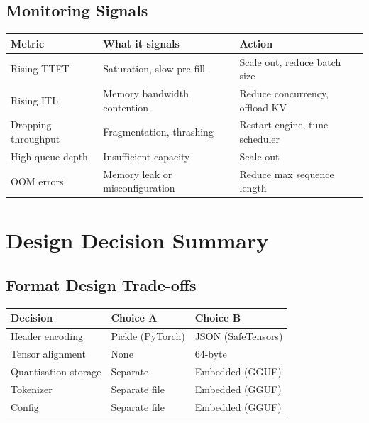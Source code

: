 \documentclass[11pt,a4paper]{article}
\theoremstyle{definition}
\begin{document}
\subsection{Monitoring Signals}

\begin{longtable}{p{3.5cm}p{4cm}p{4cm}}
	\toprule
	\textbf{Metric}     & \textbf{What it signals}        & \textbf{Action}                \\
	\midrule
	Rising TTFT         & Saturation, slow pre-fill       & Scale out, reduce batch size   \\
	Rising ITL          & Memory bandwidth contention     & Reduce concurrency, offload KV \\
	Dropping throughput & Fragmentation, thrashing        & Restart engine, tune scheduler \\
	High queue depth    & Insufficient capacity           & Scale out                      \\
	OOM errors          & Memory leak or misconfiguration & Reduce max sequence length     \\
	\bottomrule
\end{longtable}

\section{Design Decision Summary}
\label{sec:decisions}

\subsection{Format Design Trade-offs}

\begin{center}
	\begin{tabular}{p{5cm}p{5cm}p{5cm}}
		\toprule
		\textbf{Decision}    & \textbf{Choice A} & \textbf{Choice B}  \\
		\midrule
		Header encoding      & Pickle (PyTorch)  & JSON (SafeTensors) \\
		Tensor alignment     & None              & 64-byte            \\
		Quantisation storage & Separate          & Embedded (GGUF)    \\
		Tokenizer            & Separate file     & Embedded (GGUF)    \\
		Config               & Separate file     & Embedded (GGUF)    \\
		\bottomrule
	\end{tabular}
\end{center}
\end{document}
